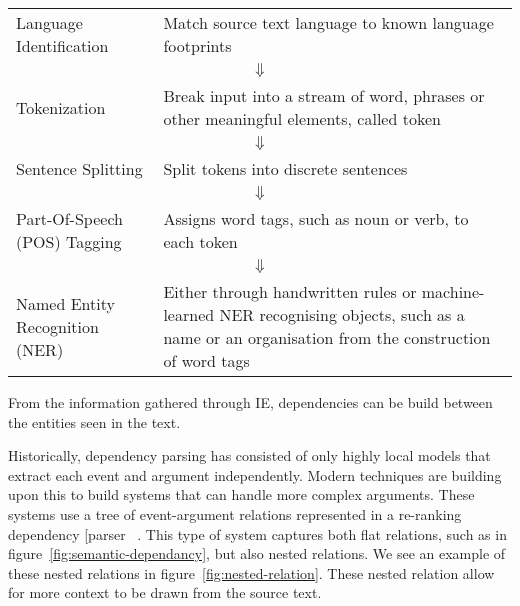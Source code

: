 \documentclass[bsc,frontabs,twoside,singlespacing,parskip,deptreport]{infthesis}     %
\begin{document}
\begin{tcolorbox}[width=\textwidth,
                  interior hidden,
                  boxsep=10pt,
                  left=0pt,
                  right=0pt,
                  top=2pt]

 \begin{tabularx}{\linewidth}{lX}

 Language Identification &  Match source text language to known language footprints\vspace{1em}\\
  \multicolumn{2}{c}{$\Downarrow$} \\
 Tokenization &  Break input into a stream of word, phrases or other meaningful elements, called token\vspace{1em}\\

  \multicolumn{2}{c}{$\Downarrow$} \\
 Sentence Splitting &  Split tokens into discrete sentences\vspace{1em}\\

  \multicolumn{2}{c}{$\Downarrow$} \\
 Part-Of-Speech (POS) Tagging &   Assigns word tags, such as noun or verb, to each token\vspace{1em} \\

  \multicolumn{2}{c}{$\Downarrow$} \\
 Named Entity Recognition (NER) &   Either through handwritten rules or machine-learned NER recognising objects, such as a name or an
    organisation from the construction of word tags

 \end{tabularx}
\end{tcolorbox}
From the information gathered through IE, dependencies can be build between the entities seen in the text.


Historically, dependency parsing has consisted of only highly local models that extract each event and argument independently.
Modern techniques are building upon this to build systems that can handle more complex arguments. These systems use a tree of
event-argument relations represented in a re-ranking dependency [parser ~\cite{mcclosky2011event}.
This type of system captures both flat relations, such as in figure~\ref{fig:semantic-dependancy}, but also nested relations.
We see an example of these nested relations in figure~\ref{fig:nested-relation}. These nested relation allow for more context to be drawn from
the source text.
\end{document}
